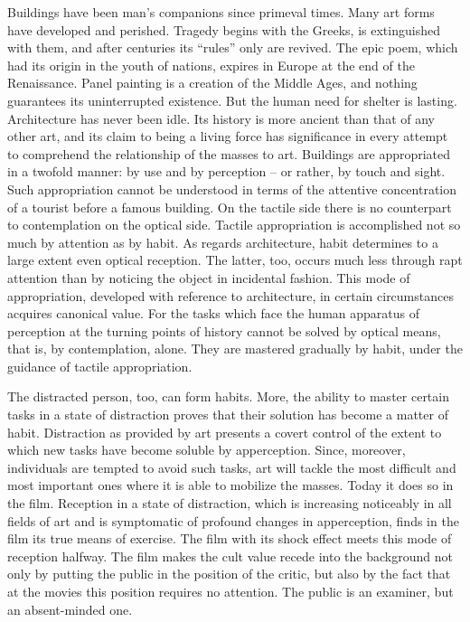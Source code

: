 \documentclass[11pt, letterpaper]{article}
\begin{document}
Buildings have been man’s companions since primeval times. Many art forms have
developed and perished. Tragedy begins with the Greeks, is extinguished with
them, and after centuries its “rules” only are revived. The epic poem, which
had its origin in the youth of nations, expires in Europe at the end of the
Renaissance. Panel painting is a creation of the Middle Ages, and nothing
guarantees its uninterrupted existence. But the human need for shelter is
lasting. Architecture has never been idle. Its history is more ancient than
that of any other art, and its claim to being a living force has significance
in every attempt to comprehend the relationship of the masses to art. Buildings
are appropriated in a twofold manner: by use and by perception – or rather, by
touch and sight. Such appropriation cannot be understood in terms of the
attentive concentration of a tourist before a famous building. On the tactile
side there is no counterpart to contemplation on the optical side. Tactile
appropriation is accomplished not so much by attention as by habit. As regards
architecture, habit determines to a large extent even optical reception. The
latter, too, occurs much less through rapt attention than by noticing the
object in incidental fashion. This mode of appropriation, developed with
reference to architecture, in certain circumstances acquires canonical value.
For the tasks which face the human apparatus of perception at the turning
points of history cannot be solved by optical means, that is, by contemplation,
alone. They are mastered gradually by habit, under the guidance of tactile
appropriation.

The distracted person, too, can form habits. More, the ability to master
certain tasks in a state of distraction proves that their solution has become a
matter of habit. Distraction as provided by art presents a covert control of
the extent to which new tasks have become soluble by apperception. Since,
moreover, individuals are tempted to avoid such tasks, art will tackle the most
difficult and most important ones where it is able to mobilize the masses.
Today it does so in the film. Reception in a state of distraction, which is
increasing noticeably in all fields of art and is symptomatic of profound
changes in apperception, finds in the film its true means of exercise. The film
with its shock effect meets this mode of reception halfway. The film makes the
cult value recede into the background not only by putting the public in the
position of the critic, but also by the fact that at the movies this position
requires no attention. The public is an examiner, but an absent-minded one.
\end{document}
